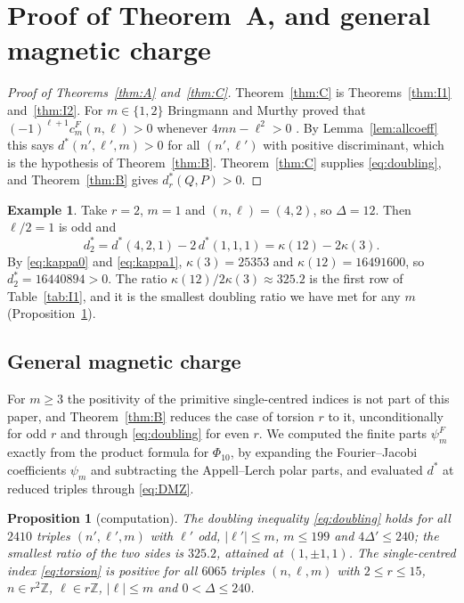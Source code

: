 \documentclass[11pt]{amsart}
\newtheorem{proposition}[theorem]{Proposition}
\theoremstyle{definition}
\newtheorem{example}[theorem]{Example}
\newcommand{\ZZ}{\mathbb{Z}}
\begin{document}
\section{Proof of Theorem~A, and general magnetic charge}\label{sec:proofA}

\begin{proof}[Proof of Theorems~\ref{thm:A} and~\ref{thm:C}]
Theorem~\ref{thm:C} is Theorems~\ref{thm:I1} and~\ref{thm:I2}. For $m\in\{1,2\}$ Bringmann and Murthy proved that $(-1)^{\ell+1}c^F_m(n,\ell)>0$ whenever $4mn-\ell^2>0$ \cite[(3.8)]{BM13}. By Lemma~\ref{lem:allcoeff} this says $d^*(n',\ell',m)>0$ for all $(n',\ell')$ with positive discriminant, which is the hypothesis of Theorem~\ref{thm:B}. Theorem~\ref{thm:C} supplies \eqref{eq:doubling}, and Theorem~\ref{thm:B} gives $d^*_r(Q,P)>0$.
\end{proof}

\begin{example}\label{ex:r2}
Take $r=2$, $m=1$ and $(n,\ell)=(4,2)$, so $\Delta=12$. Then $\ell/2=1$ is odd and
\[
d^*_2=d^*(4,2,1)-2\,d^*(1,1,1)=\kappa(12)-2\kappa(3).
\]
By \eqref{eq:kappa0} and \eqref{eq:kappa1}, $\kappa(3)=25353$ and $\kappa(12)=16491600$, so $d^*_2=16440894>0$. The ratio $\kappa(12)/2\kappa(3)\approx325.2$ is the first row of Table~\ref{tab:I1}, and it is the smallest doubling ratio we have met for any $m$ (Proposition~\ref{prop:numerics}).
\end{example}


\subsection{General magnetic charge}
For $m\ge3$ the positivity of the primitive single-centred indices is not part of this paper, and Theorem~\ref{thm:B} reduces the case of torsion $r$ to it, unconditionally for odd $r$ and through \eqref{eq:doubling} for even $r$. We computed the finite parts $\psi_m^F$ exactly from the product formula for $\Phi_{10}$, by expanding the Fourier--Jacobi coefficients $\psi_m$ and subtracting the Appell--Lerch polar parts, and evaluated $d^*$ at reduced triples through \eqref{eq:DMZ}.

\begin{proposition}[computation]\label{prop:numerics}
The doubling inequality \eqref{eq:doubling} holds for all $2410$ triples $(n',\ell',m)$ with $\ell'$ odd, $|\ell'|\le m$, $m\le199$ and $4\Delta'\le240$; the smallest ratio of the two sides is $325.2$, attained at $(1,\pm1,1)$. The single-centred index \eqref{eq:torsion} is positive for all $6065$ triples $(n,\ell,m)$ with $2\le r\le15$, $n\in r^2\ZZ$, $\ell\in r\ZZ$, $|\ell|\le m$ and $0<\Delta\le240$.
\end{proposition}
\end{document}
